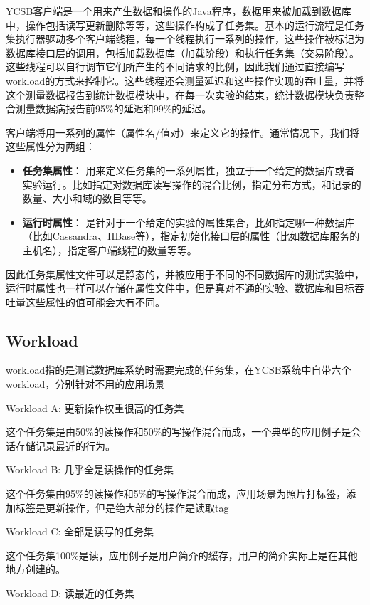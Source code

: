 		YCSB客户端是一个用来产生数据和操作的Java程序，数据用来被加载到数据库中，操作包括读写更新删除等等，这些操作构成了任务集。基本的运行流程是任务集执行器驱动多个客户端线程，每一个线程执行一系列的操作，这些操作被标记为数据库接口层的调用，包括加载数据库（加载阶段）和执行任务集（交易阶段）。这些线程可以自行调节它们所产生的不同请求的比例，因此我们通过直接编写workload的方式来控制它。这些线程还会测量延迟和这些操作实现的吞吐量，并将这个测量数据报告到统计数据模块中，在每一次实验的结束，统计数据模块负责整合测量数据病报告前95\%的延迟和99\%的延迟。

		客户端将用一系列的属性（属性名/值对）来定义它的操作。通常情况下，我们将这些属性分为两组：
		\begin{itemize}
			\item \textbf{任务集属性}：
		用来定义任务集的一系列属性，独立于一个给定的数据库或者实验运行。比如指定对数据库读写操作的混合比例，指定分布方式，和记录的数量、大小和域的数目等等。
			\item \textbf{运行时属性}：
		是针对于一个给定的实验的属性集合，比如指定哪一种数据库（比如Cassandra、HBase等），指定初始化接口层的属性（比如数据库服务的主机名），指定客户端线程的数量等等。

		\end{itemize}
		
		因此任务集属性文件可以是静态的，并被应用于不同的不同数据库的测试实验中，运行时属性也一样可以存储在属性文件中，但是真对不通的实验、数据库和目标吞吐量这些属性的值可能会大有不同。

	\subsection{Workload}
		workload指的是测试数据库系统时需要完成的任务集，在YCSB系统中自带六个workload，分别针对不用的应用场景

		Workload A: 更新操作权重很高的任务集

				这个任务集是由50\%的读操作和50\%的写操作混合而成，一个典型的应用例子是会话存储记录最近的行为。

		Workload B: 几乎全是读操作的任务集

				这个任务集由95\%的读操作和5\%的写操作混合而成，应用场景为照片打标签，添加标签是更新操作，但是绝大部分的操作是读取tag

		Workload C: 全部是读写的任务集

				这个任务集100\%是读，应用例子是用户简介的缓存，用户的简介实际上是在其他地方创建的。

		Workload D: 读最近的任务集

